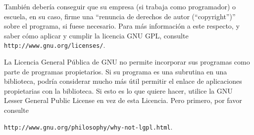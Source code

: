\documentclass[11pt]{article}
\begin{document}
\begin{enumerate}
Tambi\'{e}n deber\'{i}a conseguir que su empresa (si trabaja como programador) o 
escuela, en su caso, firme una ``renuncia de derechos de autor (``copyright'')'' sobre el programa, si 
fuese necesario. Para m\'{a}s informaci\'{o}n a este respecto, y saber c\'{o}mo aplicar 
y cumplir la licencia GNU GPL, consulte \texttt{http://www.gnu.org/licenses/}. 

La Licencia General P\'{u}blica de GNU no permite incorporar sus programas como 
parte de programas propietarios. Si su programa es una subrutina en una 
biblioteca, podr\'{i}a considerar mucho m\'{a}s \'{u}til permitir el enlace de 
aplicaciones propietarias con la biblioteca. Si esto es lo que quiere hacer, 
utilice la GNU Lesser General Public License en vez de esta Licencia. Pero primero, por favor consulte

\texttt{http://www.gnu.org/philosophy/why-not-lgpl.html}.

\end{enumerate}
\end{document}
